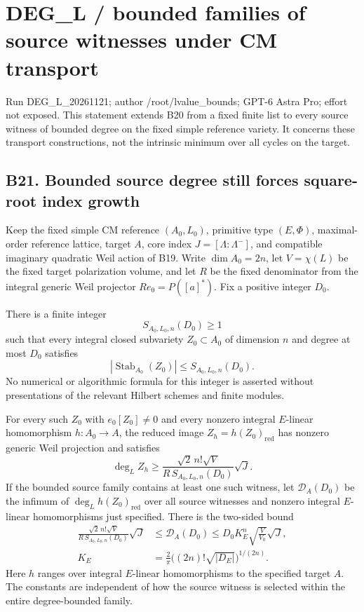 \providecommand{\tightlist}{\setlength{\itemsep}{0pt}\setlength{\parskip}{0pt}}
\section{DEG\_L / bounded families of source witnesses under CM transport}\label{deg_l-bounded-families-of-source-witnesses-under-cm-transport}

Run DEG\_L\_20261121; author /root/lvalue\_bounds; GPT-6 Astra Pro; effort not exposed. This statement extends B20 from a fixed finite list to every source witness of bounded degree on the fixed simple reference variety. It concerns these transport constructions, not the intrinsic minimum over all cycles on the target.

\subsection{B21. Bounded source degree still forces square-root index growth}\label{b21.-bounded-source-degree-still-forces-square-root-index-growth}

Keep the fixed simple CM reference \((A_0,L_0)\), primitive type \((E,\Phi)\), maximal-order reference lattice, target \(A\), core index \(J=[\Lambda:\Lambda^-]\), and compatible imaginary quadratic Weil action of B19. Write \(\dim A_0=2n\), let \(V=\chi(L)\) be the fixed target polarization volume, and let \(R\) be the fixed denominator from the integral generic Weil projector \(Re_0=P([a]^*)\). Fix a positive integer \(D_0\).

There is a finite integer \[
 S_{A_0,L_0,n}(D_0)\ge1
\] such that every integral closed subvariety \(Z_0\subset A_0\) of dimension \(n\) and degree at most \(D_0\) satisfies \[
 |\operatorname{Stab}_{A_0}(Z_0)|\le S_{A_0,L_0,n}(D_0).
\tag{B21.1}
\] No numerical or algorithmic formula for this integer is asserted without presentations of the relevant Hilbert schemes and finite modules.

For every such \(Z_0\) with \(e_0[Z_0]\ne0\) and every nonzero integral \(E\)-linear homomorphism \(h:A_0\to A\), the reduced image \(Z_h=h(Z_0)_{\mathrm{red}}\) has nonzero generic Weil projection and satisfies \[
 \deg_L Z_h
 \ge
 \frac{\sqrt2\,n!\sqrt V}
      {R\,S_{A_0,L_0,n}(D_0)}\sqrt J.
\tag{B21.2}
\] If the bounded source family contains at least one such witness, let \(\mathcal D_A(D_0)\) be the infimum of \(\deg_L h(Z_0)_{\mathrm{red}}\) over all source witnesses and nonzero integral \(E\)-linear homomorphisms just specified. There is the two-sided bound \[
 \begin{aligned}
 \frac{\sqrt2\,n!\sqrt V}
      {R\,S_{A_0,L_0,n}(D_0)}\sqrt J
 &\le \mathcal D_A(D_0)
 \le D_0K_E^n\sqrt{\frac{V}{V_0}}\sqrt J,\\
 K_E&=\frac2\pi\bigl((2n)!\sqrt{|D_E|}\bigr)^{1/(2n)}.
 \end{aligned}
\tag{B21.3}
\] Here \(h\) ranges over integral \(E\)-linear homomorphisms to the specified target \(A\). The constants are independent of how the source witness is selected within the entire degree-bounded family.

